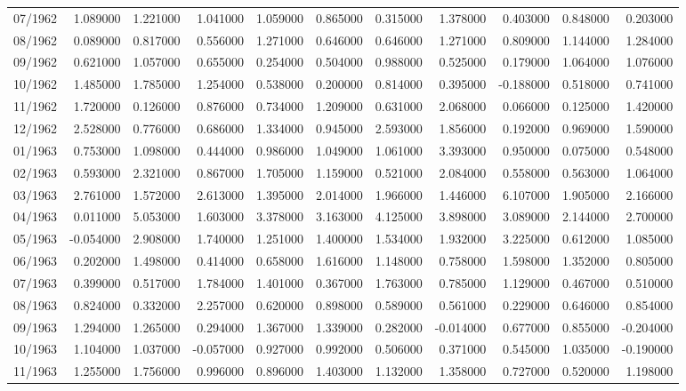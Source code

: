 \begin{tabular}{lrrrrrrrrrr}
07/1962 & 1.089000 & 1.221000 & 1.041000 & 1.059000 & 0.865000 & 0.315000 & 1.378000 & 0.403000 & 0.848000 & 0.203000 \\
08/1962 & 0.089000 & 0.817000 & 0.556000 & 1.271000 & 0.646000 & 0.646000 & 1.271000 & 0.809000 & 1.144000 & 1.284000 \\
09/1962 & 0.621000 & 1.057000 & 0.655000 & 0.254000 & 0.504000 & 0.988000 & 0.525000 & 0.179000 & 1.064000 & 1.076000 \\
10/1962 & 1.485000 & 1.785000 & 1.254000 & 0.538000 & 0.200000 & 0.814000 & 0.395000 & -0.188000 & 0.518000 & 0.741000 \\
11/1962 & 1.720000 & 0.126000 & 0.876000 & 0.734000 & 1.209000 & 0.631000 & 2.068000 & 0.066000 & 0.125000 & 1.420000 \\
12/1962 & 2.528000 & 0.776000 & 0.686000 & 1.334000 & 0.945000 & 2.593000 & 1.856000 & 0.192000 & 0.969000 & 1.590000 \\
01/1963 & 0.753000 & 1.098000 & 0.444000 & 0.986000 & 1.049000 & 1.061000 & 3.393000 & 0.950000 & 0.075000 & 0.548000 \\
02/1963 & 0.593000 & 2.321000 & 0.867000 & 1.705000 & 1.159000 & 0.521000 & 2.084000 & 0.558000 & 0.563000 & 1.064000 \\
03/1963 & 2.761000 & 1.572000 & 2.613000 & 1.395000 & 2.014000 & 1.966000 & 1.446000 & 6.107000 & 1.905000 & 2.166000 \\
04/1963 & 0.011000 & 5.053000 & 1.603000 & 3.378000 & 3.163000 & 4.125000 & 3.898000 & 3.089000 & 2.144000 & 2.700000 \\
05/1963 & -0.054000 & 2.908000 & 1.740000 & 1.251000 & 1.400000 & 1.534000 & 1.932000 & 3.225000 & 0.612000 & 1.085000 \\
06/1963 & 0.202000 & 1.498000 & 0.414000 & 0.658000 & 1.616000 & 1.148000 & 0.758000 & 1.598000 & 1.352000 & 0.805000 \\
07/1963 & 0.399000 & 0.517000 & 1.784000 & 1.401000 & 0.367000 & 1.763000 & 0.785000 & 1.129000 & 0.467000 & 0.510000 \\
08/1963 & 0.824000 & 0.332000 & 2.257000 & 0.620000 & 0.898000 & 0.589000 & 0.561000 & 0.229000 & 0.646000 & 0.854000 \\
09/1963 & 1.294000 & 1.265000 & 0.294000 & 1.367000 & 1.339000 & 0.282000 & -0.014000 & 0.677000 & 0.855000 & -0.204000 \\
10/1963 & 1.104000 & 1.037000 & -0.057000 & 0.927000 & 0.992000 & 0.506000 & 0.371000 & 0.545000 & 1.035000 & -0.190000 \\
11/1963 & 1.255000 & 1.756000 & 0.996000 & 0.896000 & 1.403000 & 1.132000 & 1.358000 & 0.727000 & 0.520000 & 1.198000 \\

\end{tabular}
